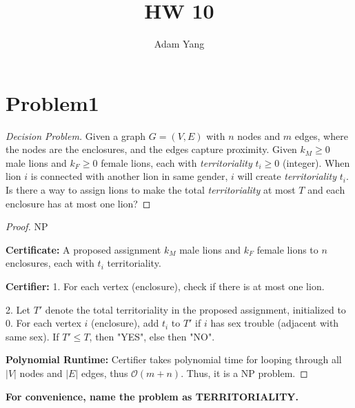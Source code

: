 \documentclass[openany]{article}
\begin{document}
\title{HW 10}
\author{Adam Yang}
\maketitle




\section*{Problem1}

\begin{proof}[Decision Problem]
    \renewcommand{\qedsymbol}{}
    
    Given a graph $G=(V,E)$ with $n$ nodes and $m$ edges, where the nodes are the enclosures, and the edges capture proximity. Given $k_M \geqslant 0$ male lions and $k_F\geqslant 0$ female lions, each with \textit{territoriality} $t_i \geqslant 0$ (integer). When lion $i$ is connected with another lion in same gender, $i$ will create \textit{territoriality} $t_i$. Is there a way to assign lions to make the total \textit{territoriality} at most $T$ and each enclosure has at most one lion?
    
\end{proof}

\begin{proof}{NP}

\textbf{Certificate:} A proposed assignment $k_M$ male lions and $k_F$ female lions to $n$ enclosures, each with $t_i$ territoriality.

\textbf{Certifier:} 
1. For each vertex (enclosure), check if there is at most one lion.

2. Let $T'$ denote the total territoriality in the proposed assignment, initialized to $0$. For each vertex $i$ (enclosure), add $t_i$ to $T'$ if $i$ has sex trouble (adjacent with same sex). If $T' \leqslant T$, then "YES", else then "NO". 

\textbf{Polynomial Runtime:} Certifier takes polynomial time for looping through all $|V|$ nodes and $|E|$ edges, thus $\mathcal{O}(m+n)$. Thus, it is a NP problem.
\end{proof}

\qquad \textbf{For convenience, name the problem as TERRITORIALITY.}
\end{document}
